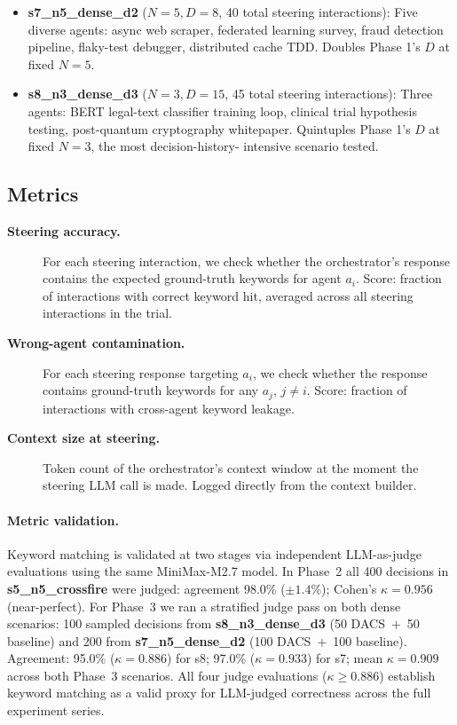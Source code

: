 \documentclass{article}
\begin{document}
\begin{itemize}
  \item \textbf{s7\_n5\_dense\_d2} ($N=5, D=8$, 40 total steering
  interactions): Five diverse agents: async web scraper, federated
  learning survey, fraud detection pipeline, flaky-test debugger,
  distributed cache TDD.
  Doubles Phase 1's $D$ at fixed $N=5$.

  \item \textbf{s8\_n3\_dense\_d3} ($N=3, D=15$, 45 total steering
  interactions): Three agents: BERT legal-text classifier training loop,
  clinical trial hypothesis testing, post-quantum cryptography
  whitepaper.
  Quintuples Phase 1's $D$ at fixed $N=3$, the most decision-history-
  intensive scenario tested.
\end{itemize}

\subsection{Metrics}
\label{sec:metrics}

\begin{description}
  \item[\textbf{Steering accuracy.}]
  For each steering interaction, we check whether the orchestrator's
  response contains the expected ground-truth keywords for agent $a_i$.
  Score: fraction of interactions with correct keyword hit, averaged
  across all steering interactions in the trial.

  \item[\textbf{Wrong-agent contamination.}]
  For each steering response targeting $a_i$, we check whether the
  response contains ground-truth keywords for any $a_j$, $j \neq i$.
  Score: fraction of interactions with cross-agent keyword leakage.

  \item[\textbf{Context size at steering.}]
  Token count of the orchestrator's context window at the moment the
  steering LLM call is made.
  Logged directly from the context builder.
\end{description}

\paragraph{Metric validation.}
Keyword matching is validated at two stages via independent LLM-as-judge
evaluations using the same MiniMax-M2.7 model.
In Phase~2 all 400 decisions in \textbf{s5\_n5\_crossfire} were judged:
agreement 98.0\% ($\pm 1.4\%$); Cohen's $\kappa = 0.956$ (near-perfect).
For Phase~3 we ran a stratified judge pass on both dense scenarios:
100 sampled decisions from \textbf{s8\_n3\_dense\_d3} (50 DACS~$+$~50 baseline)
and 200 from \textbf{s7\_n5\_dense\_d2} (100 DACS~$+$~100 baseline).
Agreement: 95.0\% ($\kappa=0.886$) for s8; 97.0\% ($\kappa=0.933$) for s7;
mean $\kappa=0.909$ across both Phase~3 scenarios.
All four judge evaluations ($\kappa \geq 0.886$) establish keyword matching
as a valid proxy for LLM-judged correctness across the full experiment series.
\end{document}
